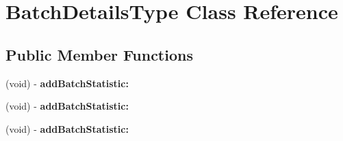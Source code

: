 \hypertarget{interface_batch_details_type}{
\section{BatchDetailsType Class Reference}
\label{interface_batch_details_type}
}
\subsection*{Public Member Functions}
\begin{DoxyCompactItemize}
\item 
\hypertarget{interface_batch_details_type_a3af340114fa0550209c1c90100b0ba8e}{
(void) -\/ {\bfseries addBatchStatistic:}}
\label{interface_batch_details_type_a3af340114fa0550209c1c90100b0ba8e}

\item 
\hypertarget{interface_batch_details_type_a3af340114fa0550209c1c90100b0ba8e}{
(void) -\/ {\bfseries addBatchStatistic:}}
\label{interface_batch_details_type_a3af340114fa0550209c1c90100b0ba8e}

\item 
\hypertarget{interface_batch_details_type_a3af340114fa0550209c1c90100b0ba8e}{
(void) -\/ {\bfseries addBatchStatistic:}}
\label{interface_batch_details_type_a3af340114fa0550209c1c90100b0ba8e}

\end{DoxyCompactItemize}
